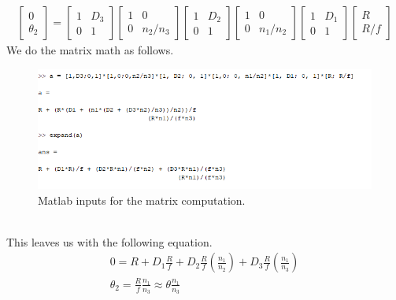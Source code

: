 \begin{gather}
    \begin{bmatrix}
        0 \\ \theta_2
    \end{bmatrix}
    = 
    \begin{bmatrix}
        1 & D_3\\ 0 & 1 
    \end{bmatrix}
    \begin{bmatrix}
        1 & 0\\ 0 & n_2/n_3 
    \end{bmatrix}
    \begin{bmatrix}
        1 & D_2\\ 0 & 1 
    \end{bmatrix}
    \begin{bmatrix}
        1 & 0\\ 0 & n_1/n_2 
    \end{bmatrix}
    \begin{bmatrix}
        1 & D_1\\ 0 & 1 
    \end{bmatrix}
    \begin{bmatrix}
        R \\ R/f
    \end{bmatrix}
\end{gather}
We do the matrix math as follows.
\begin{figure}[h]
    \centering
    \includegraphics[width=\linewidth]{image.png}
    \caption{Matlab inputs for the matrix computation.}
    \label{fig:enter-label}
\end{figure}
\\ This leaves us with the following equation.
\begin{gather}
    0 =R + D_1 \frac R f + D_2 \frac R f \left ( \frac{n_1}{n_2} \right) + D_3 \frac R f \left( \frac{n_1}{n_3}\right)\\
    \theta_2 = \frac R f \frac {n_1}{n_3} \approx \theta \frac{n_1}{n_3}
\end{gather}
